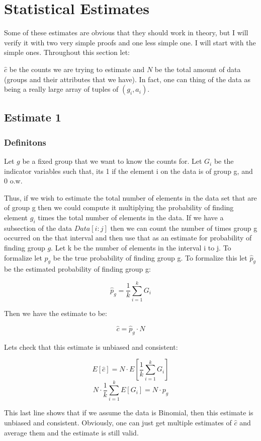 \documentclass[a4paper]{article}
\begin{document}
\section{Statistical Estimates}

Some of these estimates are obvious that they should work in theory, but I will verify it with two very simple proofs and one less simple one.
I will start with the simple ones.
Throughout this section let:

$\hat{c}$ be the counts we are trying to estimate and $N$ be the total amount of data (groups and their attributes that we have). In fact, one can thing of the data as being a really large array of tuples of $(g_i, a_{i})$.

\subsection{Estimate 1}

\subsubsection{Definitons}

Let $g$ be a fixed group that we want to know the counts for.
Let $G_i$ be the indicator variables such that, its 1 if the element i on the data is of group g, and 0 o.w.


Thus, if we wish to estimate the total number of elements in the data set that are of group g then we could compute it multiplying the probability of finding element $g_i$ times the total number of elements in the data. 
If we have a subsection of the data $Data[i:j]$ then we can count the number of times group g occurred on the that interval and then use that as an estimate for probability of finding group $g$.
Let k be the number of elements in the interval i to j.
To formalize let $p_g$ be the true probability of finding group g.
To formalize this let $\hat{p}_g$ be the estimated probability of finding group g:

$$ \hat{p}_g = \frac{1}{k} \sum^{k}_{i=1} G_i $$

Then we have the estimate to be:

$$ \hat{c} = \hat{p}_g \cdot N $$

Lets check that this estimate is unbiased and consistent:

$$E[ \hat{c} ] = N \cdot E[\frac{1}{k} \sum^{k}_{i=1} G_i ]$$
$$N \cdot \frac{1}{k} \sum^{k}_{i=1} E[G_i ] = N \cdot p_g$$

This last line shows that if we assume the data is Binomial, then this estimate is unbiased and consistent.
Obviously, one can just get multiple estimates of $\hat{c}$ and average them and the estimate is still valid.
\end{document}
